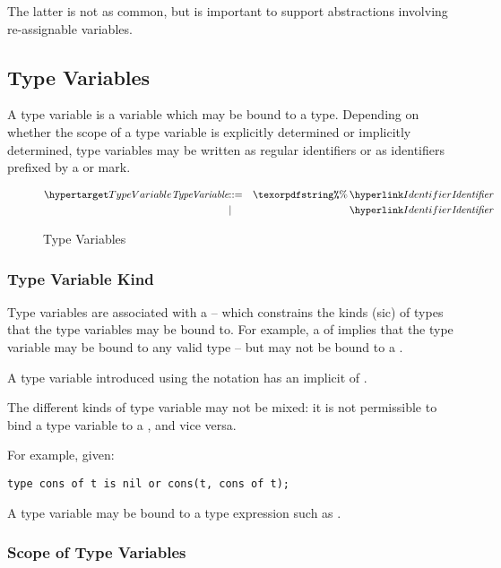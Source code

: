 \begin{aside}
The latter is not as common, but is important to support abstractions involving re-assignable variables.
\end{aside}

\subsection{Type Variables}
\label{typeVariable}

A type variable is a variable which may be bound to a type. Depending on whether the scope of a type variable is explicitly determined or implicitly determined, type variables may be written as regular identifiers or as identifiers prefixed by a \q{\pcent{}} or \q{\pcent{}\pcent{}} mark.

\begin{figure}[htbp]
\begin{eqnarray*}
\ntDef{TypeVariable}&\arrow&\q{\pcent{}}\,\ntRef{Identifier}\\
&\choice&\ntRef{Identifier}
\end{eqnarray*}
\caption{Type Variables}
\label{typeVariableFig}
\end{figure}

\subsubsection{Type Variable Kind}
Type variables are associated with a  -- which constrains the kinds (sic) of types that the type variables may be bound to. For example, a  of  implies that the type variable may be bound to any valid type -- but may not be bound to a .

A type variable introduced using the \q{\pcent{}} notation has an implicit  of .

\begin{aside}
The different kinds of type variable may not be mixed: it is not permissible to bind a type variable to a , and vice versa.

For example, given:
\begin{lstlisting}
type cons of t is nil or cons(t, cons of t);
\end{lstlisting}
A type variable  may be bound to a type expression such as .
\end{aside}

\subsubsection{Scope of Type Variables}
\label{typeVarScope}

